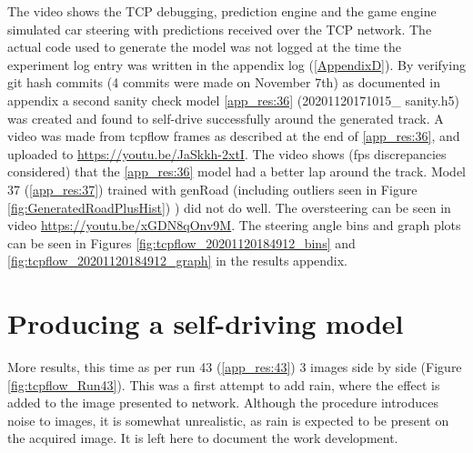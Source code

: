 The video shows the TCP debugging, prediction engine and the game engine simulated car steering with predictions received over the TCP network. The actual code used to generate the model was not logged at the time the experiment log entry was written in the appendix log (\ref{AppendixD}). By verifying git hash commits (4 commits were made on November 7th) as documented in appendix  a second sanity check model \ref{app_res:36} (20201120171015\_ sanity.h5) was created and found to self-drive successfully around the generated track. A video was made from tcpflow frames as described at the end of \ref{app_res:36}, and uploaded to \href{https://youtu.be/JaSkkh-2xtI}{https://youtu.be/JaSkkh-2xtI}.
The video shows (fps discrepancies considered) that the \ref{app_res:36} model had a better lap around the track.
Model 37 (\ref{app_res:37}) trained with genRoad (including outliers seen in Figure \ref{fig:GeneratedRoadPlusHist}) ) did not do well. The oversteering can be seen in video \href{https://youtu.be/xGDN8qOnv9M}{https://youtu.be/xGDN8qOnv9M}. The steering angle bins and graph plots can be seen in  Figures \ref{fig:tcpflow_20201120184912_bins}  and \ref{fig:tcpflow_20201120184912_graph} in the results appendix.





\section{Producing a self-driving model}


More results, this time as per run 43 (\ref{app_res:43}) 3 images side by side (Figure 
 \ref{fig:tcpflow_Run43}). This was a first attempt to add rain, where the effect is added to the image presented to network. Although the procedure introduces noise to images, it is somewhat unrealistic, as rain is expected to be present on the acquired image. It is left here to document the work development.
 
